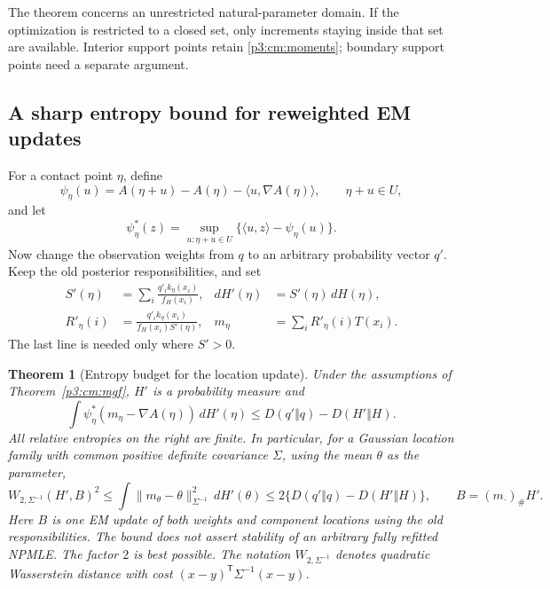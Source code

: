 \documentclass[11pt,a4paper]{article}
\newtheorem{theorem}{Theorem}[section]
\theoremstyle{definition}
\theoremstyle{remark}
\numberwithin{equation}{section}
\begin{document}
The theorem concerns an unrestricted natural-parameter domain.  If
the optimization is restricted to a closed set, only increments staying
inside that set are available.  Interior support points retain
\eqref{p3:cm:moments}; boundary support points need a separate argument.

\subsection{A sharp entropy bound for reweighted EM updates}

For a contact point $\eta$, define
\[
 \psi_\eta(u)=A(\eta+u)-A(\eta)-\langle u,\nabla A(\eta)\rangle,
 \qquad \eta+u\in U,
\]
and let
\[
 \psi_\eta^*(z)=\sup_{u:\eta+u\in U}
       \{\langle u,z\rangle-\psi_\eta(u)\}.
\]
Now change the observation weights from $q$ to an arbitrary probability
vector $q'$.  Keep the old posterior responsibilities, and set
\begin{align}
 S'(\eta)&=\sum_i\frac{q'_i k_\eta(x_i)}{f_H(x_i)},&
 dH'(\eta)&=S'(\eta)\,dH(\eta),\label{p3:cm:reweight}\\
 R'_\eta(i)&=\frac{q'_i k_\eta(x_i)}{f_H(x_i)S'(\eta)},&
 m_\eta&=\sum_iR'_\eta(i)T(x_i).\nonumber
\end{align}
The last line is needed only where $S'>0$.

\begin{theorem}[Entropy budget for the location update]
\label{p3:cm:entropy}
Under the assumptions of Theorem~\ref{p3:cm:mgf}, $H'$ is a probability
measure and
\begin{equation}\label{p3:cm:entropy-bound}
 \int\psi_\eta^*(m_\eta-\nabla A(\eta))\,dH'(\eta)
 \le D(q'\Vert q)-D(H'\Vert H).
\end{equation}
All relative entropies on the right are finite.  In particular, for a
Gaussian location family with common positive definite covariance
$\Sigma$, using the mean $\theta$ as the parameter,
\begin{equation}\label{p3:cm:gauss-em}
 W_{2,\Sigma^{-1}}(H',B)^2
 \le\int\|m_\theta-\theta\|_{\Sigma^{-1}}^2\,dH'(\theta)
 \le2\{D(q'\Vert q)-D(H'\Vert H)\},
 \qquad B=(m_\cdot)_\#H'.
\end{equation}
Here $B$ is one EM update of both weights and component locations using
the old responsibilities.  The bound does not assert stability of an
arbitrary fully refitted NPMLE.  The factor $2$ is best possible.
The notation $W_{2,\Sigma^{-1}}$ denotes quadratic Wasserstein distance
with cost $(x-y)^{\mathsf T}\Sigma^{-1}(x-y)$.
\end{theorem}
\end{document}

